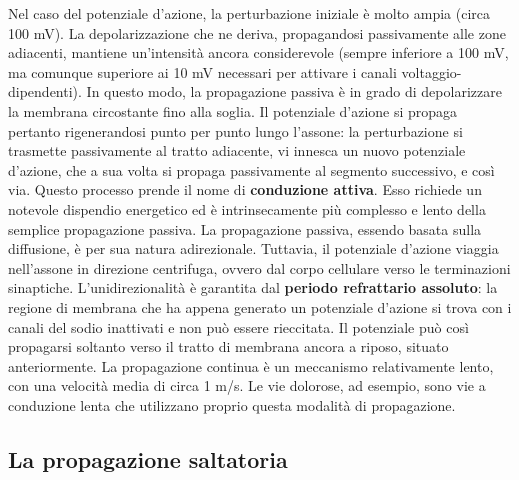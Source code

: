 Nel caso del potenziale d’azione, la perturbazione iniziale è molto ampia (circa 100 mV). La depolarizzazione che ne deriva, propagandosi passivamente alle zone adiacenti, mantiene un’intensità ancora considerevole (sempre inferiore a 100 mV, ma comunque superiore ai 10 mV necessari per attivare i canali voltaggio-dipendenti). In questo modo, la propagazione passiva è in grado di depolarizzare la membrana circostante fino alla soglia.
Il potenziale d’azione si propaga pertanto rigenerandosi punto per punto lungo l’assone: la perturbazione si trasmette passivamente al tratto adiacente, vi innesca un nuovo potenziale d’azione, che a sua volta si propaga passivamente al segmento successivo, e così via. Questo processo prende il nome di \textbf{conduzione attiva}. Esso richiede un notevole dispendio energetico ed è intrinsecamente più complesso e lento della semplice propagazione passiva.
La propagazione passiva, essendo basata sulla diffusione, è per sua natura adirezionale. Tuttavia, il potenziale d’azione viaggia nell’assone in direzione centrifuga, ovvero dal corpo cellulare verso le terminazioni sinaptiche. L’unidirezionalità è garantita dal \textbf{periodo refrattario assoluto}: la regione di membrana che ha appena generato un potenziale d’azione si trova con i canali del sodio inattivati e non può essere rieccitata. Il potenziale può così propagarsi soltanto verso il tratto di membrana ancora a riposo, situato anteriormente.
La propagazione continua è un meccanismo relativamente lento, con una velocità media di circa 1 m/s. Le vie dolorose, ad esempio, sono vie a conduzione lenta che utilizzano proprio questa modalità di propagazione.

\subsection{La propagazione saltatoria}

